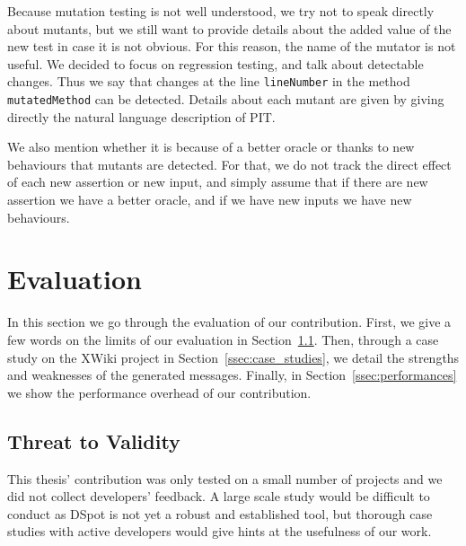 \documentclass[a4paper,11pt]{sdm_internship}
\newcommand{\todo}[1]{\colorbox{Red!75}{\textcolor{white}{\textbf{TODO\ifx&#1&\else: #1\fi}}}}
\newcommand{\dspot}{DSpot\xspace}
\theoremstyle{definition}
\begin{document}
Because mutation testing is not well understood, we try not to speak directly about mutants, but we still want to provide details about the added value of the new test in case it is not obvious.
For this reason, the name of the mutator is not useful.
We decided to focus on regression testing, and talk about detectable changes.
Thus we say that changes at the line \texttt{lineNumber} in the method \texttt{mutatedMethod} can be detected.
Details about each mutant are given by giving directly the natural language description of PIT\@.

We also mention whether it is because of a better oracle or thanks to new behaviours that mutants are detected.
For that, we do not track the direct effect of each new assertion or new input, and simply assume that if there are new assertion we have a better oracle, and if we have new inputs we have new behaviours.




\section{Evaluation}%
\label{sec:eval}
In this section we go through the evaluation of our contribution.
First, we give a few words on the limits of our evaluation in Section~\ref{ssec:threat_to_validity}.
Then, through a case study on the XWiki project in Section~\ref{ssec:case_studies}, we detail the strengths and weaknesses of the generated messages.
Finally, in Section~\ref{ssec:performances} we show the performance overhead of our contribution.

\subsection{Threat to Validity}%
\label{ssec:threat_to_validity}
This thesis' contribution was only tested on a small number of projects and we did not collect developers' feedback.
A large scale study would be difficult to conduct as \dspot{} is not yet a robust and established tool, but thorough case studies with active developers would give hints at the usefulness of our work.
\end{document}
